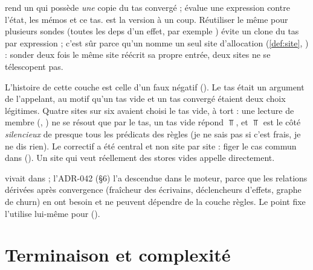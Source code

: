 

 rend un  qui possède \emph{une} copie du
tas convergé ;  évalue une expression contre l'état, les mémos et ce
tas.  est la version à un coup. Réutiliser le même
 pour plusieurs sondes (toutes les deps d'un effet, par exemple
) évite un clone du tas par
expression ; c'est sûr parce qu'un  nomme un seul site
d'allocation (\cref{def:site}, ) : sonder deux fois le même site
réécrit sa propre entrée, deux sites ne se télescopent pas.

\begin{piege}
  L'histoire de cette couche est celle d'un faux négatif ().
  Le tas était un argument de l'appelant, au motif qu'un tas vide et un tas
  convergé étaient deux choix légitimes. Quatre sites sur six avaient choisi
  le tas vide, à tort : une lecture de membre (,
  ) ne se résout que par le tas, un tas vide répond
  $\Top$, et $\Top$ est le côté \emph{silencieux} de presque tous les
  prédicats des règles (\og je ne sais pas si c'est frais, je ne dis
  rien\fg). Le correctif a été central et non site par site : figer le cas
  commun dans  (). Un
  site qui veut réellement des stores vides appelle 
  directement.
\end{piege}

 vivait dans  ; l'ADR-042 (§6) l'a
descendue dans le moteur, parce que les relations dérivées après convergence
(fraîcheur des écrivains, déclencheurs d'effets, graphe de churn) en ont
besoin et ne peuvent dépendre de la couche règles. Le point fixe l'utilise
lui-même pour  ().

\section{Terminaison et complexité}
\label{sec:cfg-analyzer-dominance-terminaison}

